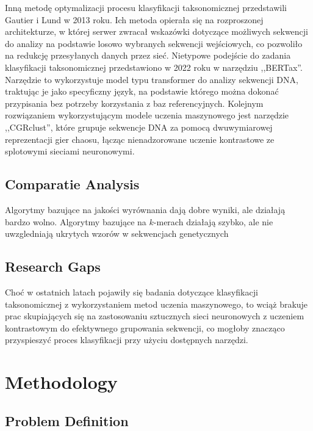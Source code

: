 \documentclass{article}
\newcommand{\temporary}[1]{
    \begin{tcolorbox}[colframe=red, colback=white, title={\textbf{WERSJA PO POLSKU}}, sharp corners=south]
        #1
    \end{tcolorbox}
}
\begin{document}
{        Inną metodę optymalizacji procesu klasyfikacji taksonomicznej przedstawili Gautier i Lund w 2013 roku\cite{Gautier:2013}. Ich metoda opierała się na rozproszonej architekturze, w której serwer zwracał wskazówki dotyczące możliwych sekwencji do analizy na podstawie losowo wybranych sekwencji wejściowych, co pozwoliło na redukcję przesyłanych danych przez sieć. Nietypowe podejście do zadania klasyfikacji taksonomicznej przedstawiono w 2022 roku w narzędziu ,,BERTax''\cite{Mock:2022}. Narzędzie to wykorzystuje model typu transformer\cite{Transformers} do analizy sekwencji DNA, traktując je jako specyficzny język, na podstawie którego można dokonać przypisania bez potrzeby korzystania z baz referencyjnych. Kolejnym rozwiązaniem wykorzystującym modele uczenia maszynowego jest narzędzie ,,CGRclust''\cite{Alipour:2024}, które grupuje sekwencje DNA za pomocą dwuwymiarowej reprezentacji gier chaosu, łącząc nienadzorowane uczenie kontrastowe ze splotowymi sieciami neuronowymi.
            }

        \subsection{Comparatie Analysis}

            \temporary{
                Algorytmy bazujące na jakości wyrównania dają dobre wyniki, ale działają bardzo wolno.
                Algorytmy bazujące na $k$-merach działają szybko, ale nie uwzgledniają ukrytych wzorów w sekwencjach genetycznych
            }

        \subsection{Research Gaps}

            \temporary{
                Choć w ostatnich latach pojawiły się badania dotyczące klasyfikacji taksonomicznej z wykorzystaniem metod uczenia maszynowego, to wciąż brakuje prac skupiających się na zastosowaniu sztucznych sieci neuronowych z uczeniem kontrastowym do efektywnego grupowania sekwencji, co mogłoby znacząco przyspieszyć proces klasyfikacji przy użyciu dostępnych narzędzi.
            }

    \section{Methodology}

        \subsection{Problem Definition}
\end{document}
